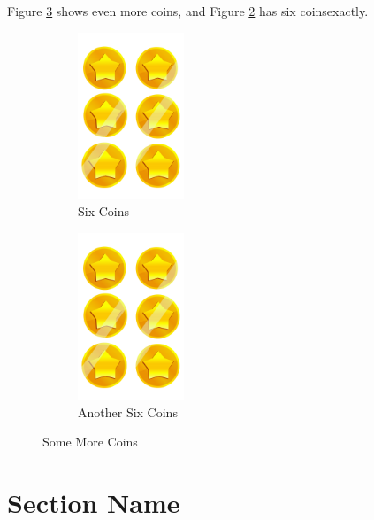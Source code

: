\documentclass[a4paper,11pt]{article}
\begin{document}
Figure \ref{fig:morecoins} shows even more coins, and Figure \ref{fig:morecoins:another} has six coinsexactly. 
\begin{figure}[h!]
    \center
    \begin{subfigure}[b]{0.4\textwidth}
        \center
        \includegraphics[width=0.35\textwidth]{resources/coin.png}
        \caption{Six Coins} \label{fig:morecoins:six}
    \end{subfigure} 
    \hspace{0.05\textwidth} %
    \begin{subfigure}[b]{0.4\textwidth}
        \center
        \includegraphics[width=0.35\textwidth, angle=90]{resources/coin.png}
        \caption{Another Six Coins} \label{fig:morecoins:another}
        \end{subfigure}
    \caption{Some More Coins} \label{fig:morecoins}
\end{figure}


\section{Section Name}
\end{document}
